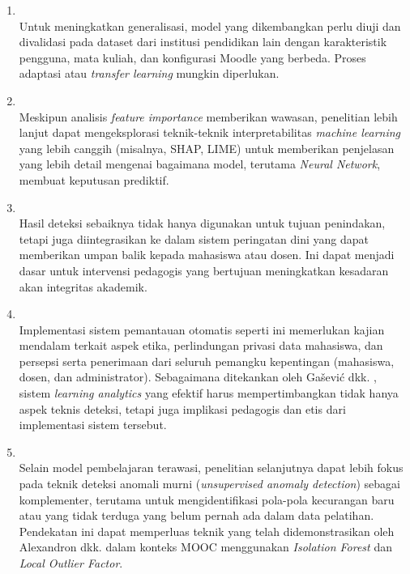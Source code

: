 \begin{enumerate}
    \item {} \\
    Untuk meningkatkan generalisasi, model yang dikembangkan perlu diuji dan divalidasi pada dataset dari institusi pendidikan lain dengan karakteristik pengguna, mata kuliah, dan konfigurasi Moodle yang berbeda. Proses adaptasi atau \textit{transfer learning} mungkin diperlukan.

    \item {} \\
    Meskipun analisis \textit{feature importance} memberikan wawasan, penelitian lebih lanjut dapat mengeksplorasi teknik-teknik interpretabilitas \textit{machine learning} yang lebih canggih (misalnya, SHAP, LIME) untuk memberikan penjelasan yang lebih detail mengenai bagaimana model, terutama \textit{Neural Network}, membuat keputusan prediktif.

    \item {} \\
    Hasil deteksi sebaiknya tidak hanya digunakan untuk tujuan penindakan, tetapi juga diintegrasikan ke dalam sistem peringatan dini yang dapat memberikan umpan balik kepada mahasiswa atau dosen. Ini dapat menjadi dasar untuk intervensi pedagogis yang bertujuan meningkatkan kesadaran akan integritas akademik.

    \item {} \\
    Implementasi sistem pemantauan otomatis seperti ini memerlukan kajian mendalam terkait aspek etika, perlindungan privasi data mahasiswa, dan persepsi serta penerimaan dari seluruh pemangku kepentingan (mahasiswa, dosen, dan administrator). Sebagaimana ditekankan oleh Gašević dkk. \cite{Gasevic2015}, sistem \textit{learning analytics} yang efektif harus mempertimbangkan tidak hanya aspek teknis deteksi, tetapi juga implikasi pedagogis dan etis dari implementasi sistem tersebut.

    \item {} \\
    Selain model pembelajaran terawasi, penelitian selanjutnya dapat lebih fokus pada teknik deteksi anomali murni (\textit{unsupervised anomaly detection}) sebagai komplementer, terutama untuk mengidentifikasi pola-pola kecurangan baru atau yang tidak terduga yang belum pernah ada dalam data pelatihan. Pendekatan ini dapat memperluas teknik yang telah didemonstrasikan oleh Alexandron dkk. \cite{Alexandron2019} dalam konteks MOOC menggunakan \textit{Isolation Forest} dan \textit{Local Outlier Factor}.
\end{enumerate}

